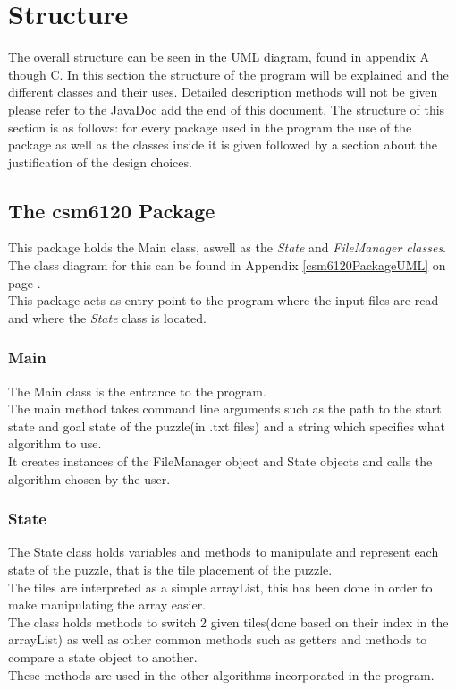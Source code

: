 \documentclass[journal]{IEEEtran}
\begin{document}
\section{Structure}\label{sec:structure}
The overall structure can be seen in the UML diagram, found in appendix A though C.
In this section the structure of the program will be explained and the different classes and their uses. Detailed description methods will not be given please refer to the JavaDoc 
add the end of this document.
The structure of this section is as follows: for every package used in the program the use of the package as well as the classes inside it is given followed by a section about the justification of the design choices. 

\subsection{The csm6120 Package}\label{sec:csm6120Package}
This package holds the Main class, aswell as the \textit{State} and \textit{FileManager classes}. \\
The class diagram for this can be found in Appendix \ref{csm6120PackageUML} on page \pageref{csm6120PackageUML}.\\
This package acts as entry point to the program where the input files are read and where the \textit{State} class is located. \\

\subsubsection{Main}
The Main class is the entrance to the program. \\
The main method takes command line arguments such as the path to the start state and goal state of the puzzle(in .txt files) and a string which specifies what algorithm to use. \\
It creates instances of the FileManager object and State objects and calls the algorithm chosen by the user.\\

\subsubsection{State}
The State class holds variables and methods to manipulate and represent each state of the puzzle, that is the tile placement of the puzzle. \\
The tiles are interpreted as a simple arrayList, this has been done in order to make manipulating the array easier. \\
The class holds methods to switch 2 given tiles(done based on their index in the arrayList) as well as other common methods such as getters and methods to compare a state object to another. \\
These methods are used in the other algorithms incorporated in the program. \\
\end{document}
